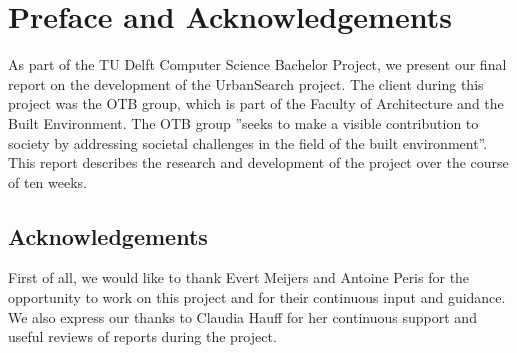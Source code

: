 \chapter*{Preface and Acknowledgements}
As part of the TU Delft Computer Science Bachelor Project, we present our final report on the development of the UrbanSearch project. The client during this project was the OTB group, which is part of the Faculty of Architecture and the Built Environment. The OTB group ”seeks to make a visible contribution to society by addressing societal challenges in the field of the built environment”. This report describes the research and development of the project over the course of ten weeks.

\section*{Acknowledgements}
First of all, we would like to thank Evert Meijers and Antoine Peris for the opportunity to work on this project and for their continuous input and guidance. We also express our thanks to Claudia Hauff for her continuous support and useful reviews of reports during the project. 